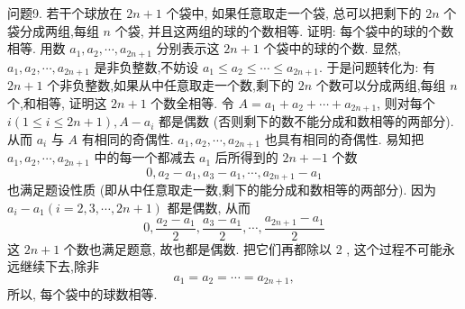 问题9. 若干个球放在 $2 n+1$ 个袋中, 如果任意取走一个袋, 总可以把剩下的 $2 n$ 个袋分成两组,每组 $n$ 个袋, 并且这两组的球的个数相等.
证明: 每个袋中的球的个数相等.
用数 $a_1, a_2, \cdots, a_{2 n+1}$ 分别表示这 $2 n+1$ 个袋中的球的个数.
显然, $a_1, a_2, \cdots, a_{2 n+1}$ 是非负整数,不妨设 $a_1 \leqslant a_2 \leqslant \cdots \leqslant a_{2 n+1}$. 于是问题转化为: 有 $2 n+1$ 个非负整数,如果从中任意取走一个数,剩下的 $2 n$ 个数可以分成两组,每组 $n$ 个,和相等, 证明这 $2 n+1$ 个数全相等.
令 $A=a_1+a_2+\cdots+a_{2 n+1}$, 则对每个 $i(1 \leqslant i \leqslant 2 n+1), A-a_i$ 都是偶数 (否则剩下的数不能分成和数相等的两部分). 从而 $a_i$ 与 $A$ 有相同的奇偶性.
$a_1, a_2, \cdots, a_{2 n+1}$ 也具有相同的奇偶性.
易知把 $a_1, a_2, \cdots, a_{2 n+1}$ 中的每一个都减去 $a_1$ 后所得到的 $2 n+-1$ 个数
$$
0, a_2-a_1, a_3-a_1, \cdots, a_{2 n+1}-a_1
$$
也满足题设性质 (即从中任意取走一数,剩下的能分成和数相等的两部分). 因为 $a_i-a_1(i=2,3, \cdots, 2 n+1)$ 都是偶数, 从而
$$
0, \frac{a_2-a_1}{2}, \frac{a_3-a_1}{2}, \cdots, \frac{a_{2 n+1}-a_1}{2}
$$
这 $2 n+1$ 个数也满足题意, 故也都是偶数.
把它们再都除以 2 , 这个过程不可能永远继续下去,除非
$$
a_1=a_2=\cdots=a_{2 n+1},
$$
所以, 每个袋中的球数相等.


